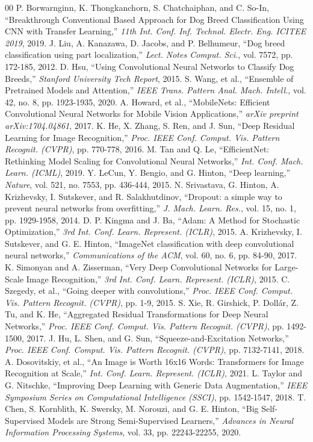 \documentclass[conference]{IEEEtran}
\begin{document}
\begin{thebibliography}{00}
 P. Borwarnginn, K. Thongkanchorn, S. Chatchaiphan, and C. So-In, ``Breakthrough Conventional Based Approach for Dog Breed Classification Using CNN with Transfer Learning,'' \textit{11th Int. Conf. Inf. Technol. Electr. Eng. ICITEE 2019}, 2019.
 J. Liu, A. Kanazawa, D. Jacobs, and P. Belhumeur, ``Dog breed classification using part localization,'' \textit{Lect. Notes Comput. Sci.}, vol. 7572, pp. 172-185, 2012.
 D. Hsu, ``Using Convolutional Neural Networks to Classify Dog Breeds,'' \textit{Stanford University Tech Report}, 2015.
 S. Wang, et al., ``Ensemble of Pretrained Models and Attention,'' \textit{IEEE Trans. Pattern Anal. Mach. Intell.}, vol. 42, no. 8, pp. 1923-1935, 2020.
 A. Howard, et al., ``MobileNets: Efficient Convolutional Neural Networks for Mobile Vision Applications,'' \textit{arXiv preprint arXiv:1704.04861}, 2017.
 K. He, X. Zhang, S. Ren, and J. Sun, ``Deep Residual Learning for Image Recognition,'' \textit{Proc. IEEE Conf. Comput. Vis. Pattern Recognit. (CVPR)}, pp. 770-778, 2016.
 M. Tan and Q. Le, ``EfficientNet: Rethinking Model Scaling for Convolutional Neural Networks,'' \textit{Int. Conf. Mach. Learn. (ICML)}, 2019.
 Y. LeCun, Y. Bengio, and G. Hinton, ``Deep learning,'' \textit{Nature}, vol. 521, no. 7553, pp. 436-444, 2015.
 N. Srivastava, G. Hinton, A. Krizhevsky, I. Sutskever, and R. Salakhutdinov, ``Dropout: a simple way to prevent neural networks from overfitting,'' \textit{J. Mach. Learn. Res.}, vol. 15, no. 1, pp. 1929-1958, 2014.
 D. P. Kingma and J. Ba, ``Adam: A Method for Stochastic Optimization,'' \textit{3rd Int. Conf. Learn. Represent. (ICLR)}, 2015.
 A. Krizhevsky, I. Sutskever, and G. E. Hinton, ``ImageNet classification with deep convolutional neural networks,'' \textit{Communications of the ACM}, vol. 60, no. 6, pp. 84-90, 2017.
 K. Simonyan and A. Zisserman, ``Very Deep Convolutional Networks for Large-Scale Image Recognition,'' \textit{3rd Int. Conf. Learn. Represent. (ICLR)}, 2015.
 C. Szegedy, et al., ``Going deeper with convolutions,'' \textit{Proc. IEEE Conf. Comput. Vis. Pattern Recognit. (CVPR)}, pp. 1-9, 2015.
 S. Xie, R. Girshick, P. Dollár, Z. Tu, and K. He, ``Aggregated Residual Transformations for Deep Neural Networks,'' \textit{Proc. IEEE Conf. Comput. Vis. Pattern Recognit. (CVPR)}, pp. 1492-1500, 2017.
 J. Hu, L. Shen, and G. Sun, ``Squeeze-and-Excitation Networks,'' \textit{Proc. IEEE Conf. Comput. Vis. Pattern Recognit. (CVPR)}, pp. 7132-7141, 2018.
 A. Dosovitskiy, et al., ``An Image is Worth 16x16 Words: Transformers for Image Recognition at Scale,'' \textit{Int. Conf. Learn. Represent. (ICLR)}, 2021.
 L. Taylor and G. Nitschke, ``Improving Deep Learning with Generic Data Augmentation,'' \textit{IEEE Symposium Series on Computational Intelligence (SSCI)}, pp. 1542-1547, 2018.
 T. Chen, S. Kornblith, K. Swersky, M. Norouzi, and G. E. Hinton, ``Big Self-Supervised Models are Strong Semi-Supervised Learners,'' \textit{Advances in Neural Information Processing Systems}, vol. 33, pp. 22243-22255, 2020.
\end{thebibliography}
\end{document}
